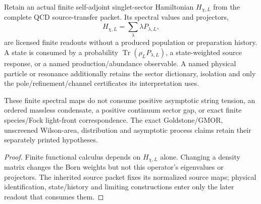 \documentclass[12pt,a4paper]{article}
\begin{document}
\begin{corollary}
\label{p11:cor:v2187-spectrum-before-population}
Retain an actual finite self-adjoint singlet-sector Hamiltonian
$H_{\chi,L}$ from the complete QCD source-transfer packet.  Its spectral
values and projectors,
\[
 H_{\chi,L}=\sum_{\lambda}\lambda P_{\lambda,L},
\]
are licensed finite readouts without a produced population or preparation
history.  A state is consumed by a probability
$\operatorname{Tr}(\rho_LP_{\lambda,L})$, a state-weighted source response,
or a named production/abundance observable.  A named physical particle or
resonance additionally retains the sector dictionary, isolation and only the
pole/refinement/channel certificates its interpretation uses.

These finite spectral maps do not consume positive asymptotic string tension,
an ordered massless condensate, a positive continuum sector gap, or exact
finite species/Fock light-front correspondence.  The exact Goldstone/GMOR,
unscreened Wilson-area, distribution and asymptotic process claims retain
their separately printed hypotheses.
\end{corollary}
\begin{proof}
Finite functional calculus depends on $H_{\chi,L}$ alone.  Changing a density
matrix changes the Born weights but not this operator's eigenvalues or
projectors.  The inherited source packet fixes its normalized source maps;
physical identification, state/history and limiting constructions enter only
the later readout that consumes them.
\end{proof}

\end{document}
